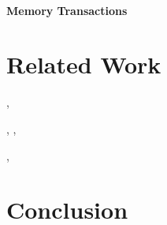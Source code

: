 \documentclass[conference, 10pt]{IEEEtran}
\begin{document}
\paragraph{Memory Transactions}

\label{sec:experiments}

\section{Related Work}
\label{sec:related-work}

\cite{ref:ptl-sim}, \cite{ref:simple-scalar}



\cite{ref:ramp}

\cite{ref:ocelot-pact}

\cite{ref:pdes}, \cite{ref:multi-threaded-sim},
\cite{ref:cuda-simulation-of-many-core}

\cite{ref:verilog-cuda}, \cite{ref:bluespec} 

\cite{ref:lynx}


\section{Conclusion}
\label{sec:conclusion}




\end{document}
